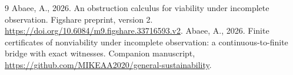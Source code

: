 \documentclass[11pt,a4paper]{article}
\theoremstyle{plain}
\theoremstyle{definition}
\theoremstyle{remark}
\begin{document}
\begin{thebibliography}{9}
 Abaee, A., 2026. An obstruction calculus for viability under incomplete observation. Figshare preprint, version 2. \url{https://doi.org/10.6084/m9.figshare.33716593.v2}.
 Abaee, A., 2026. Finite certificates of nonviability under incomplete observation: a continuous-to-finite bridge with exact witnesses. Companion manuscript, \url{https://github.com/MIKEAA2020/general-sustainability}.
\end{thebibliography}
\end{document}
